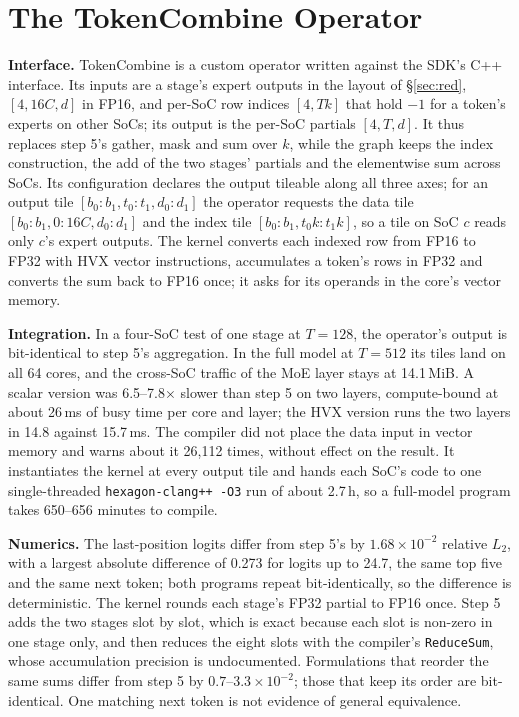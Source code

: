 \section{The TokenCombine Operator}
\label{app:custom}

\textbf{Interface.} TokenCombine is a custom operator written against the SDK's C++ interface. Its inputs are a stage's
expert outputs in the layout of \S\ref{sec:red}, $[4,16C,d]$ in FP16, and per-SoC row indices $[4,Tk]$ that hold $-1$ for a
token's experts on other SoCs; its output is the per-SoC partials $[4,T,d]$. It thus replaces step 5's gather, mask and sum
over $k$, while the graph keeps the index construction, the add of the two stages' partials and the elementwise sum across
SoCs. Its configuration declares the output tileable along all three axes; for an output tile $[b_0{:}b_1,t_0{:}t_1,d_0{:}d_1]$
the operator requests the data tile $[b_0{:}b_1,0{:}16C,d_0{:}d_1]$ and the index tile $[b_0{:}b_1,t_0k{:}t_1k]$, so a tile
on SoC $c$ reads only $c$'s expert outputs. The kernel converts each indexed row from FP16 to FP32 with HVX vector
instructions, accumulates a token's rows in FP32 and converts the sum back to FP16 once; it asks for its operands in the
core's vector memory.

\textbf{Integration.} In a four-SoC test of one stage at $T=128$, the operator's output is bit-identical to step 5's
aggregation. In the full model at $T=512$ its tiles land on all 64 cores, and the cross-SoC traffic of the MoE layer stays
at 14.1\,MiB. A scalar version was 6.5--7.8$\times$ slower than step 5 on two layers, compute-bound at about 26\,ms of busy
time per core and layer; the HVX version runs the two layers in 14.8 against 15.7\,ms. The compiler did not place the data
input in vector memory and warns about it 26,112 times, without effect on the result. It instantiates the kernel at every
output tile and hands each SoC's code to one single-threaded \texttt{hexagon-clang++ -O3} run of about 2.7\,h, so a
full-model program takes 650--656 minutes to compile.

\textbf{Numerics.} The last-position logits differ from step 5's by $1.68\times10^{-2}$ relative $L_2$, with a largest
absolute difference of 0.273 for logits up to 24.7, the same top five and the same next token; both programs repeat
bit-identically, so the difference is deterministic. The kernel rounds each stage's FP32 partial to FP16 once. Step 5 adds
the two stages slot by slot, which is exact because each slot is non-zero in one stage only, and then reduces the eight
slots with the compiler's \texttt{ReduceSum}, whose accumulation precision is undocumented. Formulations that reorder the
same sums differ from step 5 by $0.7$--$3.3\times10^{-2}$; those that keep its order are bit-identical. One matching next
token is not evidence of general equivalence.
